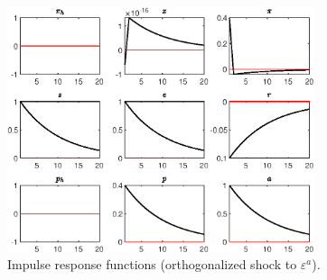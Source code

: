  
\begin{figure}[H]
\centering 
\includegraphics[width=0.80\textwidth]{Gali_Monacelli_2005/graphs/Gali_Monacelli_2005_IRF_eps_a}
\caption{Impulse response functions (orthogonalized shock to ${\varepsilon^{a}}$).}
\label{Fig:IRF:eps_a}
\end{figure}
 
 
